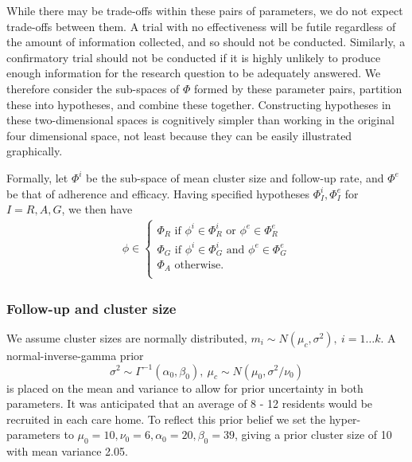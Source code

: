 \documentclass[AMA,STIX1COL]{WileyNJD-v2}
\begin{document}
While there may be trade-offs within these pairs of parameters, we do not expect trade-offs between them. A trial with no effectiveness will be futile regardless of the amount of information collected, and so should not be conducted. Similarly, a confirmatory trial should not be conducted if it is highly unlikely to produce enough information for the research question to be adequately answered. We therefore consider the sub-spaces of $\Phi$ formed by these parameter pairs, partition these into hypotheses, and combine these together. Constructing hypotheses in these two-dimensional spaces is cognitively simpler than working in the original four dimensional space, not least because they can be easily illustrated graphically.

Formally, let $\Phi^i$ be the sub-space of mean cluster size and follow-up rate, and $\Phi^e$ be that of adherence and efficacy. Having specified hypotheses $\Phi^i_I, \Phi^e_I$ for $I = R,A,G$, we then have 
\begin{align}\label{eqn:comb_hyp}
\phi \in \begin{cases}
               \Phi_R \text{ if }  \phi^i \in \Phi^i_R \text{ or } \phi^e \in \Phi^e_R \\
               \Phi_G \text{ if }  \phi^i \in \Phi^i_G \text{ and } \phi^e \in \Phi^e_G \\
               \Phi_A \text{ otherwise}. \\
            \end{cases}
\end{align}

\subsubsection{Follow-up and cluster size}

We assume cluster sizes are normally distributed, $m_{i} \sim N(\mu_{c}, \sigma^{2}),~ i = 1 \ldots k$. A normal-inverse-gamma prior 
\begin{equation}
\sigma^{2} \sim \Gamma^{-1} (\alpha_{0}, \beta_{0}), ~ \mu_{c} \sim N(\mu_{0}, \sigma^{2}/\nu_{0})
\end{equation}
is placed on the mean and variance to allow for prior uncertainty in both parameters. It was anticipated that an average of 8 - 12 residents would be recruited in each care home. To reflect this prior belief we set the hyper-parameters to $\mu_{0} = 10, \nu_{0} = 6, \alpha_{0} = 20, \beta_{0} = 39$, giving a prior cluster size of 10 with mean variance 2.05.
\end{document}
